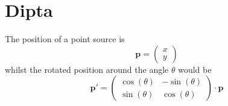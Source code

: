 \section{Dipta}
The position of a point source is 
\begin{equation*}
    \mathbf{p} = \left(\begin{matrix} x\\y
    \end{matrix}\right)
\end{equation*}
whilst the rotated position around the angle $\theta$ would be
\begin{equation*}
    \mathbf{p'}=\left(\begin{matrix}
        \cos(\theta) & -\sin(\theta)\\ 
        \sin(\theta) & \cos(\theta)
    \end{matrix}\right) \cdot \mathbf{p}
\end{equation*}